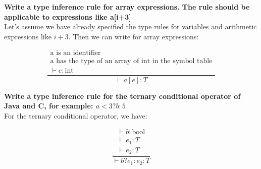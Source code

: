 \textbf{Write a type inference rule for array expressions. The rule should be applicable to expressions like a{[i+3]}} \\
Let's assume we have already specified the type rules for variables and arithmetic expressions like \(i+3\). Then we can write for array expressions:
\begin{center}
    \[
    \frac{
        \begin{array}{c}
        \text{a is an identifier} \\
        \text{a has the type of an array of int in the symbol table} \\
        \vdash e : \text{int}
        \end{array}
    }{
        \vdash a[e] : T
    }
    \]
\end{center}
\textbf{Write a type inference rule for the ternary conditional operator of Java and C, for example:
$a<3 ? b : 5$} \\
For the ternary conditional operator, we have:
\begin{center}
    \[
    \frac{
        \begin{array}{c}
        \vdash b : \text{bool} \\
        \vdash e_1 : T \\
        \vdash e_2 : T
        \end{array}
    }{
        \vdash b ? e_1 : e_2 : T
    }
    \]
\end{center}
